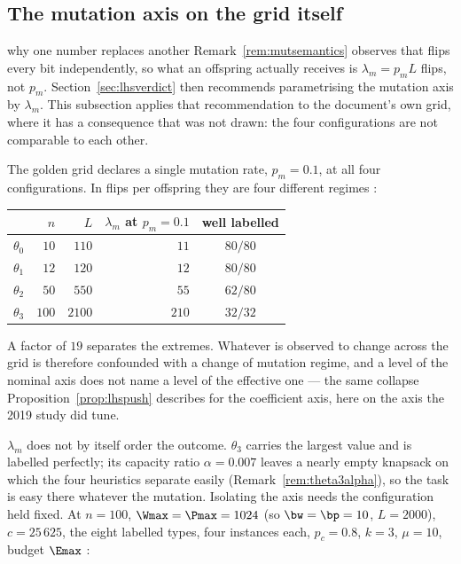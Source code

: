 \subsection{The mutation axis on the grid itself}\label{sec:mutgrid}

\begin{whatis}{why one number replaces another}
Remark~\ref{rem:mutsemantics} observes that  flips every bit independently, so
what an offspring actually receives is $\lambda_m=p_mL$ flips, not $p_m$. Section~\ref{sec:lhsverdict}
then recommends parametrising the mutation axis by $\lambda_m$. This subsection applies that
recommendation to the document's own grid, where it has a consequence that was not drawn: the
four configurations are not comparable to each other.
\end{whatis}

The golden grid declares a single mutation rate, $p_m=0.1$, at all four configurations. In
flips per offspring they are four different regimes :

\begin{center}\small
\begin{tabular}{@{}lrrrc@{}}
\toprule
 & $n$ & $L$ & $\lambda_m$ at $p_m=0.1$ & well labelled \\
\midrule
$\theta_0$ & $10$  & $110$  & $11$  & $80/80$ \\
$\theta_1$ & $12$  & $120$  & $12$  & $80/80$ \\
$\theta_2$ & $50$  & $550$  & $55$  & $62/80$ \\
$\theta_3$ & $100$ & $2100$ & $210$ & $32/32$ \\
\bottomrule
\end{tabular}
\end{center}

A factor of $19$ separates the extremes. Whatever is observed to change across the grid is
therefore confounded with a change of mutation regime, and a level of the nominal axis does
not name a level of the effective one --- the same collapse Proposition~\ref{prop:lhspush}
describes for the coefficient axis, here on the axis the 2019 study did tune.

$\lambda_m$ does not by itself order the outcome. $\theta_3$ carries the largest value and is
labelled perfectly; its capacity ratio $\alpha=0.007$ leaves a nearly empty knapsack on which
the four heuristics separate easily (Remark~\ref{rem:theta3alpha}), so the task is easy there
whatever the mutation. Isolating the axis needs the configuration held fixed. At $n=100$,
$\Wmax=\Pmax=1024$ (so $\bw=\bp=10$, $L=2000$), $c=25\,625$, the eight labelled types, four
instances each, $p_c=0.8$, $k=3$, $\mu=10$, budget $\Emax$ :

